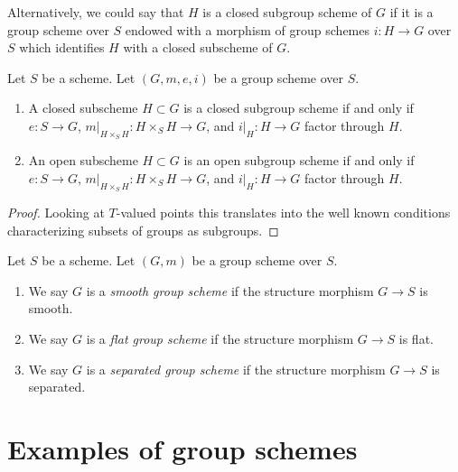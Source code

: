 \noindent
Alternatively, we could say that $H$ is a closed subgroup scheme of $G$
if it is a group scheme over $S$ endowed with a morphism of group schemes
$i : H \to G$ over $S$ which identifies $H$ with a closed subscheme of $G$.

\begin{lemma}
\label{lemma-closed-subgroup-scheme}
Let $S$ be a scheme. Let $(G, m, e, i)$ be a group scheme over $S$.
\begin{enumerate}
\item A closed subscheme $H \subset G$ is a closed subgroup scheme
if and only if $e : S \to G$, $m|_{H \times_S H} : H \times_S H \to G$,
and $i|_H : H \to G$ factor through $H$.
\item An open subscheme $H \subset G$ is an open subgroup scheme
if and only if $e : S \to G$, $m|_{H \times_S H} : H \times_S H \to G$,
and $i|_H : H \to G$ factor through $H$.
\end{enumerate}
\end{lemma}

\begin{proof}
Looking at $T$-valued points this translates into the well known
conditions characterizing subsets of groups as subgroups.
\end{proof}

\begin{definition}
\label{definition-smooth-group-scheme}
Let $S$ be a scheme. Let $(G, m)$ be a group scheme over $S$.
\begin{enumerate}
\item We say $G$ is a {\it smooth group scheme} if the structure
morphism $G \to S$ is smooth.
\item We say $G$ is a {\it flat group scheme} if the structure
morphism $G \to S$ is flat.
\item We say $G$ is a {\it separated group scheme} if the structure
morphism $G \to S$ is separated.
\end{enumerate}
\end{definition}






\section{Examples of group schemes}
\label{section-examples-group-schemes}

